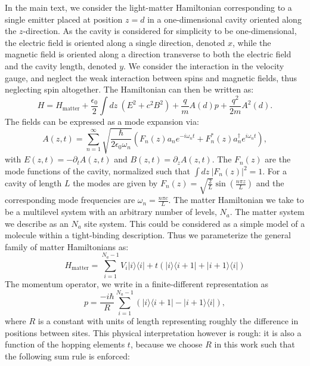 \documentclass[aps,prb,twocolumn,
	groupedaddress,superscriptaddress,
	amsfonts,amssymb,amsmath,floatfix,
	citeautoscript]{revtex4-1}
\begin{document}
In the main text, we consider the light-matter Hamiltonian corresponding to a single emitter placed at position $z=d$ in a one-dimensional cavity oriented along the $z$-direction. As the cavity is considered for simplicity to be one-dimensional, the electric field is oriented along a single direction, denoted $x$, while the magnetic field is oriented along a direction transverse to both the electric field and the cavity length, denoted $y$. We consider the interaction in the velocity gauge, and neglect the weak interaction between spins and magnetic fields, thus neglecting spin altogether. The Hamiltonian can then be written as:
\begin{equation}\label{eq:hamiltonian}
H = H_{\text{matter}}+\frac{\epsilon_0}{2}\int dz~(E^2+c^2B^2)+\frac{q}{m}A(d)p + \frac{q^2}{2m}A^2(d).
\end{equation}
The fields can be expressed as a mode expansion via:
\begin{equation}\label{eq:mode_expansion}
A(z,t) = \sum\limits_{n=1}^{\infty} \sqrt{\frac{\hbar}{2\epsilon_0\omega_n }}(F_n(z)a_ne^{-i\omega_n t}+F^*_n(z)a_n^{\dagger}e^{i\omega_n t}),
\end{equation}
with $E(z,t) = -\partial_t A(z,t)$ and $B(z,t)=\partial_z A(z,t)$.  The $F_n(z)$ are the mode functions of the cavity, normalized such that $\int dz ~|F_n(z)|^2 = 1$. For a cavity of length $L$ the modes are given by $F_n(z) = \sqrt{\frac{2}{L}}\sin\left(\frac{n\pi z}{L} \right)$ and the corresponding mode frequencies are $\omega_n = \frac{n\pi c}{L}$. The matter Hamiltonian we take to be a multilevel system with an arbitrary number of levels, $N_a$. The matter system we describe as an $N_a$ site system. This could be considered as a simple model of a molecule within a tight-binding description. Thus we parameterize the general family of matter Hamiltonians as:
\begin{equation}\label{eq:matter_hamiltonian}
H_{\text{matter}} = \sum\limits_{i=1}^{{N_a-1}} V_i|i\rangle\langle i|+t(|i\rangle\langle i+1|+|i+1\rangle\langle i|) 
\end{equation}
The momentum operator, we write in a finite-different representation as
\begin{equation}\label{eq:momentum_operator}
p = \frac{-i\hbar}{R}\sum\limits_{i=1}^{N_a-1} \left(|i\rangle\langle i+1|-|i+1\rangle\langle i| \right),
\end{equation}
where $R$ is a constant with units of length representing roughly the difference in positions between sites. This physical interpretation however is rough: it is also a function of the hopping elements $t$, because we choose $R$ in this work such that the following sum rule is enforced: 
\end{document}
